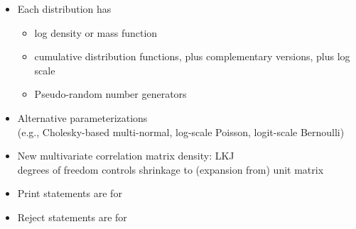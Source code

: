 \documentclass[10pt]{report}
\begin{document}
%
\begin{itemize}
\item Each distribution has
  \vspace*{-4pt}
  \begin{itemize}\small
  \item log density or mass function
  \item cumulative distribution functions, plus complementary versions,
    plus log scale
  \item Pseudo-random number generators
  \end{itemize}
\item Alternative parameterizations
  \\
  {\footnotesize (e.g., Cholesky-based multi-normal,
    log-scale Poisson, logit-scale Bernoulli)}
\item New multivariate correlation matrix density: LKJ
  \\
  {\footnotesize degrees of freedom controls
    shrinkage to (expansion from) unit matrix}
\end{itemize}


%
\begin{itemize}
\item Print statements are for 
\item Reject statements are for 
\end{itemize}
\end{document}
